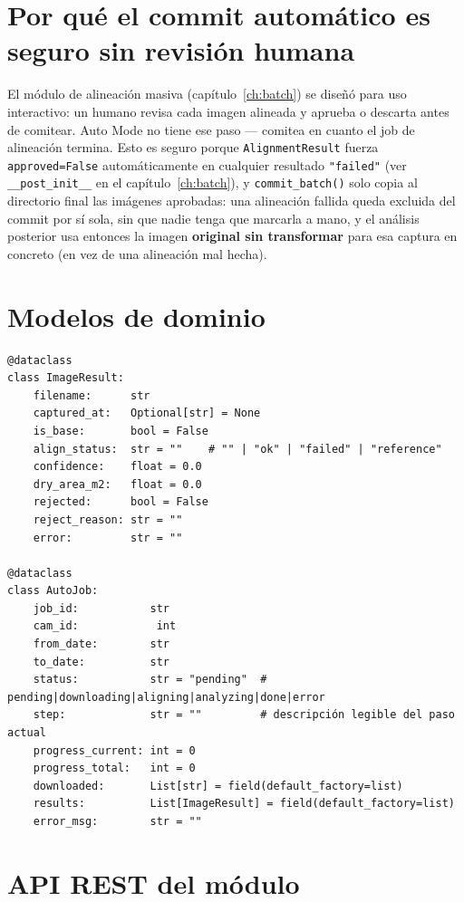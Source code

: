 \section{Por qué el commit automático es seguro sin revisión humana}
\label{sec:automode-commit}

El módulo de alineación masiva (capítulo~\ref{ch:batch}) se diseñó para uso interactivo: un
humano revisa cada imagen alineada y aprueba o descarta antes de comitear. Auto Mode no tiene
ese paso — comitea en cuanto el job de alineación termina. Esto es seguro porque
\texttt{AlignmentResult} fuerza \texttt{approved=False} automáticamente en cualquier resultado
\texttt{"failed"} (ver \texttt{\_\_post\_init\_\_} en el capítulo~\ref{ch:batch}), y
\texttt{commit\_batch()} solo copia al directorio final las imágenes aprobadas: una alineación
fallida queda excluida del commit por sí sola, sin que nadie tenga que marcarla a mano, y el
análisis posterior usa entonces la imagen \textbf{original sin transformar} para esa captura en
concreto (en vez de una alineación mal hecha).

\section{Modelos de dominio}

\begin{codebox}
\begin{verbatim}
@dataclass
class ImageResult:
    filename:      str
    captured_at:   Optional[str] = None
    is_base:       bool = False
    align_status:  str = ""    # "" | "ok" | "failed" | "reference"
    confidence:    float = 0.0
    dry_area_m2:   float = 0.0
    rejected:      bool = False
    reject_reason: str = ""
    error:         str = ""

@dataclass
class AutoJob:
    job_id:           str
    cam_id:            int
    from_date:        str
    to_date:          str
    status:           str = "pending"  # pending|downloading|aligning|analyzing|done|error
    step:             str = ""         # descripción legible del paso actual
    progress_current: int = 0
    progress_total:   int = 0
    downloaded:       List[str] = field(default_factory=list)
    results:          List[ImageResult] = field(default_factory=list)
    error_msg:        str = ""
\end{verbatim}
\end{codebox}

\section{API REST del módulo}

